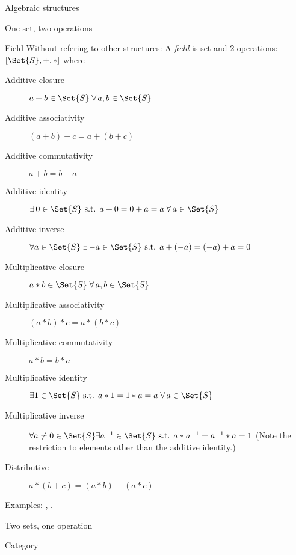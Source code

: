 \begin{plSection}{Algebraic structures}
\begin{plSection}{One set, two operations}
\begin{plSection}{Field}
Without refering to other structures:
A \textit{field} is set and 2 operations: 
$\left[ \Set{S}, +, * \right]$
where
\begin{description}
  \item[Additive closure] $a + b \in \Set{S} \; 
  \forall \, a,b \in \Set{S}$ 
  \item[Additive associativity] 
  $\left( a + b \right) + c = a + \left( b + c \right)$ 
  \item[Additive commutativity] $a + b = b + a$ 
  \item[Additive identity] $\exists \, 0 \in \Set{S} \text{ s.t. } 
  a + 0 = 0 + a = a \; \forall \, a \in \Set{S}$ 
  \item[Additive inverse] $\forall a \in \Set{S} \; 
  \exists \, {-a} \in \Set{S} 
  \text{ s.t. }  a + \left( -a \right) = \left( -a \right) + a = 0$ 
  \item[Multiplicative closure] $a * b \in \Set{S} \; \forall \,a,b \in \Set{S}$ 
  \item[Multiplicative associativity] 
  $\left( a * b \right) * c = a * \left( b * c \right)$ 
  \item[Multiplicative commutativity] $a * b = b * a$ 
  \item[Multiplicative identity] $\exists 1 \in \Set{S}
   \text{ s.t. } 
  a * 1 = 1 * a = a \; \forall \, a \in \Set{S}$ 
  \item[Multiplicative inverse] $\forall a \ne 0 \in \Set{S} 
  \exists a^{-1} \in \Set{S}
  \text{ s.t. }  a * a^{-1} = a^{-1} * a = 1$ 
  (Note the restriction to elements other than the additive identity.) 
  \item[Distributive] $a * \left( b + c \right) 
  = \left( a * b \right) + \left( a * c \right)$
\end{description}


Examples: 
, .

\end{plSection}
\end{plSection}
\begin{plSection}{Two sets, one operation}
\begin{plSection}{Category}


\end{plSection}
\end{plSection}
\end{plSection}
